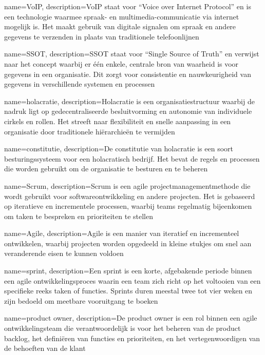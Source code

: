 {
    name=VoIP,
    description={VoIP staat voor ``Voice over Internet Protocol'' en is een technologie waarmee spraak- en multimedia-communicatie via internet mogelijk is. Het maakt gebruik van digitale signalen om spraak en andere gegevens te verzenden in plaats van traditionele telefoonlijnen}
}

{
    name=SSOT,
    description={SSOT staat voor ``Single Source of Truth'' en verwijst naar het concept waarbij er één enkele, centrale bron van waarheid is voor gegevens in een organisatie. Dit zorgt voor consistentie en nauwkeurigheid van gegevens in verschillende systemen en processen}
}

{
    name=holacratie,
    description={Holacratie is een organisatiestructuur waarbij de nadruk ligt op gedecentraliseerde besluitvorming en autonomie van individuele cirkels en rollen. Het streeft naar flexibiliteit en snelle aanpassing in een organisatie door traditionele hiërarchieën te vermijden}
}

{
    name=constitutie,
    description={De constitutie van holacratie is een soort besturingssysteem voor een holacratisch bedrijf. Het bevat de regels en processen die worden gebruikt om de organisatie te besturen en te beheren}
}

{
    name=Scrum,
    description={Scrum is een agile projectmanagementmethode die wordt gebruikt voor softwareontwikkeling en andere projecten. Het is gebaseerd op iteratieve en incrementele processen, waarbij teams regelmatig bijeenkomen om taken te bespreken en prioriteiten te stellen}
}

{
    name=Agile,
    description={Agile is een manier van iteratief en incrementeel ontwikkelen, waarbij projecten worden opgedeeld in kleine stukjes om snel aan veranderende eisen te kunnen voldoen}
}

{
    name=sprint,
    description={Een sprint is een korte, afgebakende periode binnen een agile ontwikkelingsproces waarin een team zich richt op het voltooien van een specifieke reeks taken of functies. Sprints duren meestal twee tot vier weken en zijn bedoeld om meetbare vooruitgang te boeken}
}

{
    name=product owner,
    description={De product owner is een rol binnen een agile ontwikkelingsteam die verantwoordelijk is voor het beheren van de product backlog, het definiëren van functies en prioriteiten, en het vertegenwoordigen van de behoeften van de klant}
}

